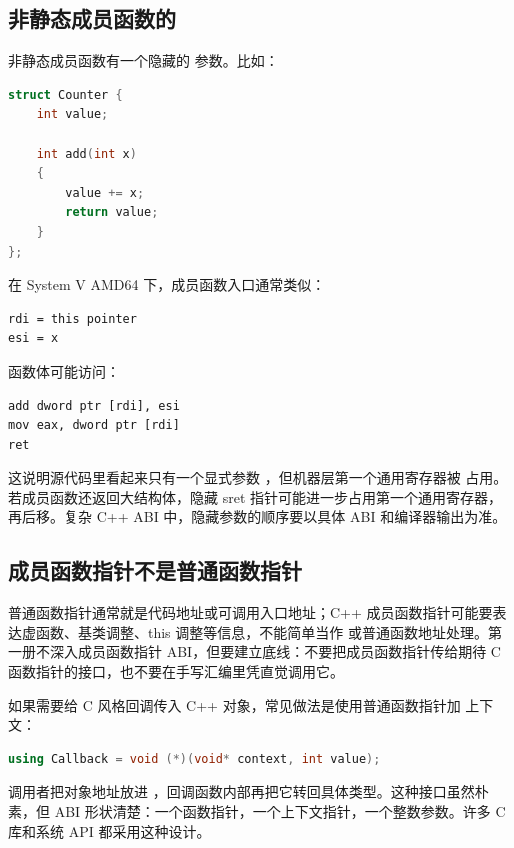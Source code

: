 \subsection{非静态成员函数的 }

非静态成员函数有一个隐藏的  参数。比如：

\begin{lstlisting}[language=C++]
struct Counter {
    int value;

    int add(int x)
    {
        value += x;
        return value;
    }
};
\end{lstlisting}

在 System V AMD64 下，成员函数入口通常类似：

\begin{lstlisting}
rdi = this pointer
esi = x
\end{lstlisting}

函数体可能访问：

\begin{lstlisting}
add dword ptr [rdi], esi
mov eax, dword ptr [rdi]
ret
\end{lstlisting}

这说明源代码里看起来只有一个显式参数 ，但机器层第一个通用寄存器被  占用。若成员函数还返回大结构体，隐藏 sret 指针可能进一步占用第一个通用寄存器， 再后移。复杂 C++ ABI 中，隐藏参数的顺序要以具体 ABI 和编译器输出为准。

\subsection{成员函数指针不是普通函数指针}

普通函数指针通常就是代码地址或可调用入口地址；C++ 成员函数指针可能要表达虚函数、基类调整、this 调整等信息，不能简单当作  或普通函数地址处理。第一册不深入成员函数指针 ABI，但要建立底线：不要把成员函数指针传给期待 C 函数指针的接口，也不要在手写汇编里凭直觉调用它。

如果需要给 C 风格回调传入 C++ 对象，常见做法是使用普通函数指针加  上下文：

\begin{lstlisting}[language=C++]
using Callback = void (*)(void* context, int value);
\end{lstlisting}

调用者把对象地址放进 ，回调函数内部再把它转回具体类型。这种接口虽然朴素，但 ABI 形状清楚：一个函数指针，一个上下文指针，一个整数参数。许多 C 库和系统 API 都采用这种设计。

